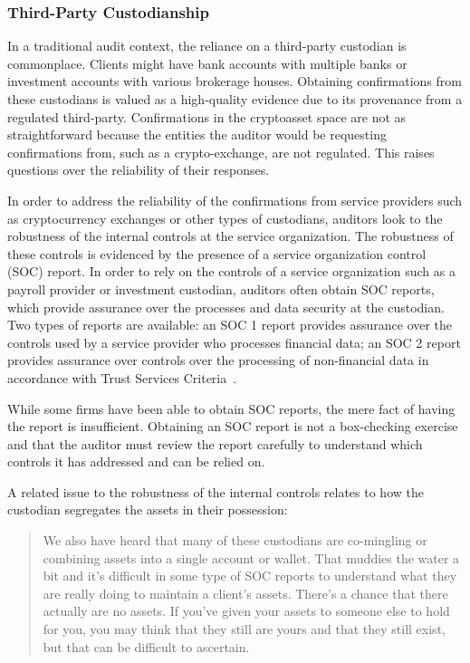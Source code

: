 \subsubsection{Third-Party Custodianship}\label{sec:auditing:framework:ownership:custodianship}
In a traditional audit context, the reliance on a third-party custodian is commonplace. Clients might have bank accounts with multiple banks or investment accounts with various brokerage houses. Obtaining confirmations from these custodians is valued as a high-quality evidence due to its provenance from a regulated third-party. Confirmations in the cryptoasset space are not as straightforward because the entities the auditor would be requesting confirmations from, such as a crypto-exchange, are not regulated. This raises questions over the reliability of their responses. 

In order to address the reliability of the confirmations from service providers such as cryptocurrency exchanges or other types of custodians, auditors look to the robustness of the internal controls at the service organization. The robustness of these controls is evidenced by the presence of a service organization control (SOC) report. In order to rely on the controls of a service organization such as a payroll provider or investment custodian, auditors often obtain SOC reports, which provide assurance over the processes and data security at the custodian. Two types of reports are available: an SOC 1 report provides assurance over the controls used by a service provider who processes financial data; an SOC 2 report provides assurance over controls over the processing of non-financial data in accordance with Trust Services Criteria~\cite{bdosocreports}. 

While some firms have been able to obtain SOC reports, the mere fact of having the report is insufficient. Obtaining an SOC report is not a box-checking exercise and that the auditor must review the report carefully to understand which controls it has addressed and can be relied on.

A related issue to the robustness of the internal controls relates to how the custodian segregates the assets in their possession: 

\begin{quote}
We also have heard that many of these custodians are co-mingling or combining assets into a single account or wallet. That muddies the water a bit and it's difficult in some type of SOC reports to understand what they are really doing to maintain a client's assets. There's a chance that there actually are no assets. If you've given your assets to someone else to hold for you, you may think that they still are yours and that they still exist, but that can be difficult to ascertain.
\end{quote}

